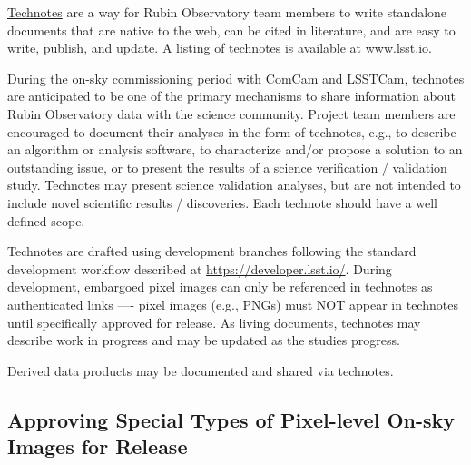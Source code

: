 \documentclass[SE,authoryear,toc]{lsstdoc}
\begin{document}
\href{https://developer.lsst.io/project-docs/technotes.html}{Technotes} are a way for Rubin Observatory team members to write standalone documents that are native to the web, can be cited in literature, and are easy to write, publish, and update.
A listing of technotes is available at \url{www.lsst.io}.

During the on-sky commissioning period with ComCam and LSSTCam, technotes are anticipated to be one of the primary mechanisms to share information about Rubin Observatory data with the science community.
Project team members are encouraged to document their analyses in the form of technotes, e.g., to describe an algorithm or analysis software, to characterize and/or propose a solution to an outstanding issue, or to present the results of a science verification / validation study.
Technotes may present science validation analyses, but are not intended to include novel scientific results / discoveries.
Each technote should have a well defined scope.

Technotes are drafted using development branches following the standard development workflow described at \url{https://developer.lsst.io/}.
During development, embargoed pixel images can only be referenced in technotes as authenticated links —- pixel images (e.g., PNGs) must NOT appear in technotes until specifically approved for release.
As living documents, technotes may describe work in progress and may be updated as the studies progress.

Derived data products may be documented and shared via technotes.

\subsection{Approving Special Types of Pixel-level On-sky Images for Release}
\label{special_classes}
\end{document}
